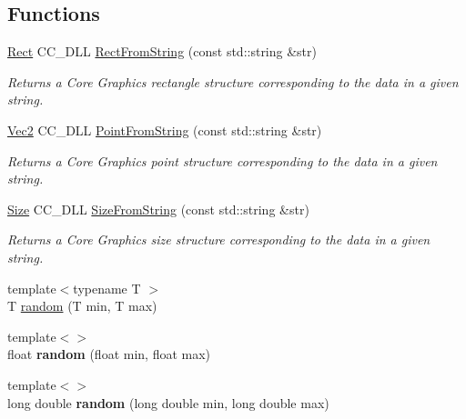 \subsection*{Functions}
\begin{DoxyCompactItemize}
\item 
\hyperlink{classRect}{Rect} C\+C\+\_\+\+D\+LL \hyperlink{group__base_gada35ca7274b8913c2341dbe8c78300bb}{Rect\+From\+String} (const std\+::string \&str)
\begin{DoxyCompactList}\small\item\em Returns a Core Graphics rectangle structure corresponding to the data in a given string. \end{DoxyCompactList}\item 
\hyperlink{classVec2}{Vec2} C\+C\+\_\+\+D\+LL \hyperlink{group__base_ga53f75124b92b17a0a61e956597a04335}{Point\+From\+String} (const std\+::string \&str)
\begin{DoxyCompactList}\small\item\em Returns a Core Graphics point structure corresponding to the data in a given string. \end{DoxyCompactList}\item 
\hyperlink{classSize}{Size} C\+C\+\_\+\+D\+LL \hyperlink{group__base_gaac2ed1c93abba93b0631f2a1c7167e39}{Size\+From\+String} (const std\+::string \&str)
\begin{DoxyCompactList}\small\item\em Returns a Core Graphics size structure corresponding to the data in a given string. \end{DoxyCompactList}\item 
{\footnotesize template$<$typename T $>$ }\\T \hyperlink{group__base_ga2b4200418788b03a7f38acd502ddd67f}{random} (T min, T max)
\item 
\mbox{\label{group__base_ga90f3c3150ffe9b555a4827f7d51aa1ff}} 
{\footnotesize template$<$$>$ }\\float {\bfseries random} (float min, float max)
\item 
\mbox{\label{group__base_ga94a506f53ac769191e64bef3cdc1cdf0}} 
{\footnotesize template$<$$>$ }\\long double {\bfseries random} (long double min, long double max)
\item 
\mbox{\label{group__base_ga5c0039363072709f7e886e4fe20c7a40}} 

\end{DoxyCompactItemize}
